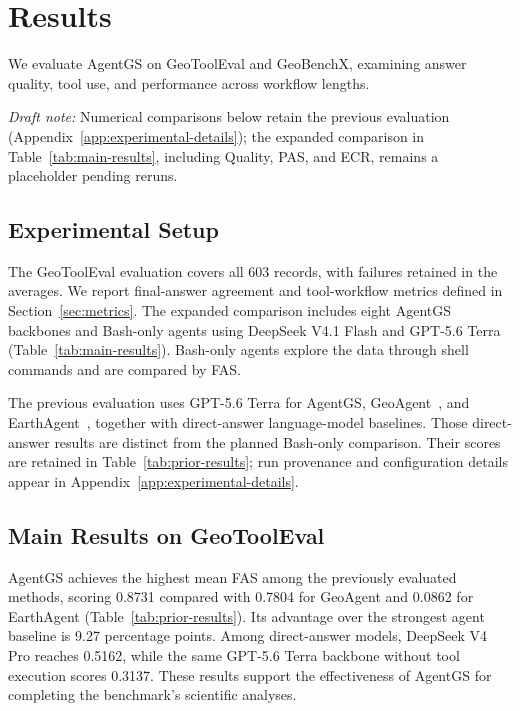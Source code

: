 \section{Results}
\label{sec:experiments}

We evaluate AgentGS on GeoToolEval and GeoBenchX, examining answer quality, tool use, and performance across workflow lengths.

\emph{Draft note:} Numerical comparisons below retain the previous evaluation (Appendix~\ref{app:experimental-details}); the expanded comparison in Table~\ref{tab:main-results}, including Quality, PAS, and ECR, remains a placeholder pending reruns.

\subsection{Experimental Setup}
\label{sec:experimental-setup}
The GeoToolEval evaluation covers all 603 records, with failures retained in the averages. We report final-answer agreement and tool-workflow metrics defined in Section~\ref{sec:metrics}. The expanded comparison includes eight AgentGS backbones and Bash-only agents using DeepSeek V4.1 Flash and GPT-5.6 Terra (Table~\ref{tab:main-results}). Bash-only agents explore the data through shell commands and are compared by FAS.

The previous evaluation uses GPT-5.6 Terra for AgentGS, GeoAgent~\cite{chen2024geoagent}, and EarthAgent~\cite{feng2026earthagent}, together with direct-answer language-model baselines. Those direct-answer results are distinct from the planned Bash-only comparison. Their scores are retained in Table~\ref{tab:prior-results}; run provenance and configuration details appear in Appendix~\ref{app:experimental-details}.

\subsection{Main Results on GeoToolEval}
\label{sec:main-results}
AgentGS achieves the highest mean FAS among the previously evaluated methods, scoring 0.8731 compared with 0.7804 for GeoAgent and 0.0862 for EarthAgent (Table~\ref{tab:prior-results}). Its advantage over the strongest agent baseline is 9.27 percentage points. Among direct-answer models, DeepSeek V4 Pro reaches 0.5162, while the same GPT-5.6 Terra backbone without tool execution scores 0.3137. These results support the effectiveness of AgentGS for completing the benchmark's scientific analyses.

